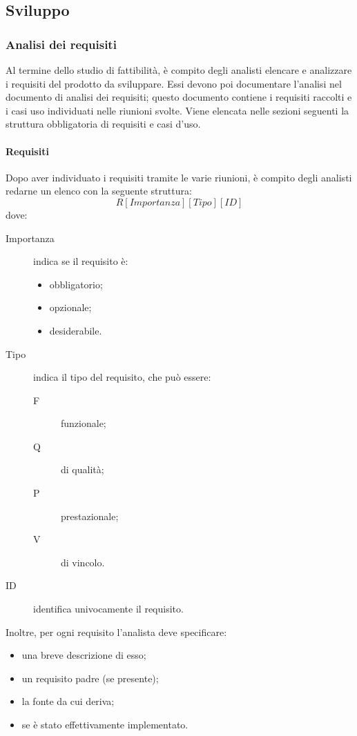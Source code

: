 \subsection{Sviluppo}
	\subsubsection{Analisi dei requisiti}
	Al termine dello studio di fattibilità, è compito degli analisti elencare e analizzare i requisiti del prodotto da sviluppare. Essi devono poi documentare l'analisi nel documento di analisi dei requisiti; questo documento contiene i requisiti raccolti e i casi uso individuati nelle riunioni svolte.
	Viene elencata nelle sezioni seguenti la struttura obbligatoria di requisiti e casi d'uso.
		\paragraph{Requisiti} %
		Dopo aver individuato i requisiti tramite le varie riunioni, è compito degli analisti redarne un elenco con la seguente struttura:
			\[R[Importanza][Tipo][ID]\]
		dove:
		\begin{description}
			\item[Importanza] indica se il requisito è:
			\begin{itemize}
				\item obbligatorio;
				\item opzionale;
				\item desiderabile.
			\end{itemize}
			\item[Tipo] indica il tipo del requisito, che può essere:
			\begin{description}
				\item[F] funzionale;
				\item[Q] di qualità;
				\item[P] prestazionale;
				\item[V] di vincolo.
			\end{description}
			\item[ID] identifica univocamente il requisito.
		\end{description}
		Inoltre, per ogni requisito l'analista deve specificare:
		\begin{itemize}
			\item una breve descrizione di esso;
			\item un requisito padre (se presente);
			\item la fonte da cui deriva;
			\item se è stato effettivamente implementato.
		\end{itemize}
